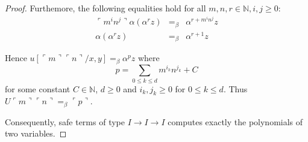 \documentclass{article}
\newcommand{\encode}[1]{\ulcorner #1 \urcorner}
\newcommand{\nat}{\mathbb{N}}
\begin{document}
\begin{proof}
Furthemore, the following equalities hold for all $m,n,r\in \nat,i,j\geq 0$:
\begin{eqnarray*}
\encode{m^i n^j} \alpha (\alpha^r z) &=_\beta&
\alpha^{r + m^i n^j} z \\
\alpha ( \alpha^r z ) &=_\beta& \alpha^{r+1} z
\end{eqnarray*}

Hence $u[\encode{m} \encode{n}/x,y] =_\beta \alpha^p z$ where
$$ p = \sum_{0\leq k \leq d} m^{i_k} n^{j_k} + C$$
for some constant $C \in \nat$, $d\geq 0$ and $i_k,j_k \geq 0$ for $0 \leq k \leq d$. Thus $U \encode{m} \encode{n} =_\beta \encode{p}$. 

Consequently, safe terms of type $I \rightarrow I \rightarrow I$ computes
exactly the polynomials of two variables.

%
%


\end{proof}
\end{document}
